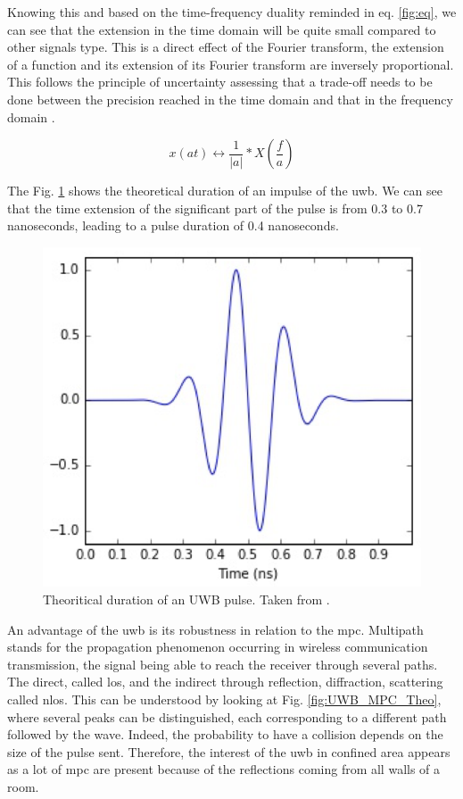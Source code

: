 Knowing this and based on the time-frequency duality reminded in eq. \ref{fig:eq}, we can see that the extension in the time domain will be quite small compared to other signals type. This is a direct effect of the Fourier transform, the extension of a function and its extension of its Fourier transform are inversely proportional. This follows the principle of uncertainty assessing that a trade-off needs to be done between the precision reached in the time domain and that in the frequency domain \cite{donoho1989uncertainty}.

\begin{equation}
	x(at) \longleftrightarrow \frac{1}{|a|}*X(\frac{f}{a})
\label{fig:eq}
\end{equation}

The Fig. \ref{fig:UWB_time} shows the theoretical duration of an impulse of the \gls{uwb}. We can see that the time extension of the significant part of the pulse is from 0.3 to 0.7 nanoseconds, leading to a pulse duration of 0.4 nanoseconds.

\begin{figure}[H]
\centering
\includegraphics[width=.4\linewidth]{Images/uwb_pulse.png}
\caption{Theoritical duration of an UWB pulse. Taken from \cite{defraye2017determining}.}
\label{fig:UWB_time}
\end{figure}

An advantage of the \gls{uwb} is its robustness in relation to the \gls{mpc}. Multipath stands for the propagation phenomenon occurring in wireless communication transmission, the signal being able to reach the receiver through several paths. The direct, called \gls{los}, and the indirect through reflection, diffraction, scattering called \gls{nlos}.  This can be understood by looking at Fig. \ref{fig:UWB_MPC_Theo}, where several peaks can be distinguished, each corresponding to a different path followed by the wave. Indeed, the probability to have a collision depends on the size of the pulse sent. Therefore, the interest of the \gls{uwb} in confined area appears as a lot of \gls{mpc} are present because of the reflections coming from all walls of a room.

